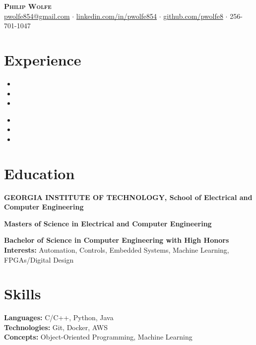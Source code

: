 \documentclass[11pt, a4paper]{article}
\newcommand{\header}[7]{
  \begin{center}
    {\LARGE \bfseries\scshape #1}\\
    \vspace{2mm}
    \href{mailto:#2}{#2} $\cdot$ \href{#3}{#6} $\cdot$ \href{#4}{#7} $\cdot$ #5\\
    \vspace{0mm}
  \end{center}
}
\begin{document}
\header{Philip Wolfe}{pwolfe854@gmail.com}{https://www.linkedin.com/in/pwolfe854}{https://github.com/pwolfe8}{256-701-1047}{linkedin.com/in/pwolfe854}{github.com/pwolfe8}

\section*{Experience}

\workplaceGTRI
\begin{itemize}
  \item \fpgaShort
  \item \fpgaMedium
  \item \fpgaLong
\end{itemize}

\workplaceBeam
\begin{itemize}
  \item \fpgaShort
  \item \fpgaMedium
  \item \fpgaLong
\end{itemize}


\section*{Education}
{\small
\textbf{GEORGIA INSTITUTE OF TECHNOLOGY, School of Electrical and Computer Engineering}\par
\textbf{Masters of Science in Electrical and Computer Engineering}\par
\textbf{Bachelor of Science in Computer Engineering with High Honors}\\
\textbf{Interests:} Automation, Controls, Embedded Systems, Machine Learning, FPGAs/Digital Design
}

\section*{Skills}
\textbf{Languages:} C/C++, Python, Java\\
\textbf{Technologies:} Git, Docker, AWS\\
\textbf{Concepts:} Object-Oriented Programming, Machine Learning
\end{document}
